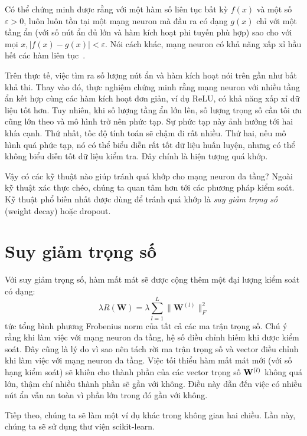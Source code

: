 Có thể chứng minh được rằng với một hàm số liên tục bất kỳ $f(x)$ và một
số $\varepsilon >0$, luôn luôn tồn tại một mạng neuron mà đầu ra có dạng
$g(x)$ chỉ với một tầng ẩn (với số nút ẩn đủ lớn và hàm kích hoạt phi
tuyến phù hợp) sao cho với mọi $x, |f(x) - g(x)| < \varepsilon$. Nói cách
khác, mạng neuron có khả năng xấp xỉ hầu hết các hàm liên tục~\cite{cybenko1989approximation}.

Trên thực tế, việc tìm ra số lượng nút ẩn và hàm kích hoạt nói trên gần như bất
khả thi. Thay vào đó, thực nghiệm chứng minh rằng mạng neuron với nhiều tầng ẩn
kết hợp cùng các hàm kích hoạt đơn giản, ví dụ ReLU, có khả năng xấp xỉ dữ liệu
tốt hơn. Tuy nhiên, khi số lượng tầng ẩn lớn lên, số lượng trọng số cần tối ưu
cũng lớn theo và mô hình trở nên phức tạp. Sự phức tạp này ảnh hưởng tới hai
khía cạnh. Thứ nhất, tốc độ tính toán sẽ chậm đi rất nhiều. Thứ hai, nếu mô hình
quá phức tạp, nó có thể biểu diễn rất tốt dữ liệu huấn luyện, nhưng có thể không
biểu diễn tốt dữ liệu kiểm tra. Đây chính là hiện tượng quá khớp.

Vậy có các kỹ thuật nào giúp tránh quá khớp cho mạng neuron đa tầng?
Ngoài kỹ thuật xác thực chéo, chúng ta quan tâm hơn tới các phương pháp
kiểm soát. Kỹ thuật phổ biến nhất được dùng để
tránh quá khớp là \textit{suy giảm trọng số} (weight decay) hoặc dropout.

\section{Suy giảm trọng số}
Với suy giảm trọng số, hàm mất mát sẽ được cộng thêm một đại lượng kiểm soát có
dạng:
\begin{equation*}
\lambda R(\mathbf{W}) = \lambda \sum_{l=1}^L \|\mathbf{W}^{(l)}\|_F^2
\end{equation*}
tức tổng bình phương Frobenius norm của tất cả các ma trận trọng số. Chú ý rằng khi
làm việc với mạng neuron đa tầng, hệ số điều chỉnh hiếm khi được kiểm soát. Đây cũng là lý
do vì sao nên tách rời ma trận trọng số và vector điều chỉnh khi làm việc với mạng neuron
đa tầng. Việc tối thiểu hàm mất mát mới (với số hạng kiểm soát) sẽ khiến cho
thành phần của các vector trọng số $\mathbf{W}^{(l)}$ không quá lớn, thậm chí nhiều thành
phần sẽ gần với không. Điều này dẫn đến việc có nhiều nút ẩn vẫn an toàn vì phần
lớn trong đó gần với không.

Tiếp theo, chúng ta sẽ làm một ví dụ khác trong không gian hai chiều. Lần này,
chúng ta sẽ sử dụng thư viện scikit-learn.




